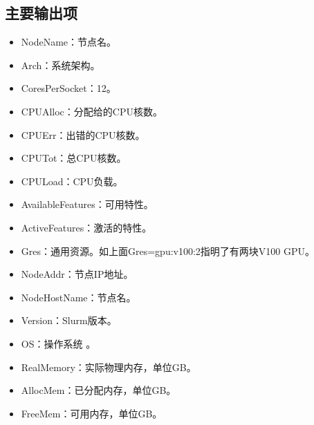 \documentclass[a4paper,12pt,english]{sphinxmanual}
\begin{document}
\subsection{主要输出项}
\label{\detokenize{slurm/slurm:id15}}\label{\detokenize{slurm/slurm:id16}}\begin{itemize}
\item {} 
\sphinxAtStartPar
NodeName：节点名。

\item {} 
\sphinxAtStartPar
Arch：系统架构。

\item {} 
\sphinxAtStartPar
CoresPerSocket：12。

\item {} 
\sphinxAtStartPar
CPUAlloc：分配给的CPU核数。

\item {} 
\sphinxAtStartPar
CPUErr：出错的CPU核数。

\item {} 
\sphinxAtStartPar
CPUTot：总CPU核数。

\item {} 
\sphinxAtStartPar
CPULoad：CPU负载。

\item {} 
\sphinxAtStartPar
AvailableFeatures：可用特性。

\item {} 
\sphinxAtStartPar
ActiveFeatures：激活的特性。

\item {} 
\sphinxAtStartPar
Gres：通用资源。如上面Gres=gpu:v100:2指明了有两块V100 GPU。

\item {} 
\sphinxAtStartPar
NodeAddr：节点IP地址。

\item {} 
\sphinxAtStartPar
NodeHostName：节点名。

\item {} 
\sphinxAtStartPar
Version：Slurm版本。

\item {} 
\sphinxAtStartPar
OS：操作系统 。

\item {} 
\sphinxAtStartPar
RealMemory：实际物理内存，单位GB。

\item {} 
\sphinxAtStartPar
AllocMem：已分配内存，单位GB。

\item {} 
\sphinxAtStartPar
FreeMem：可用内存，单位GB。


\end{itemize}
\end{document}
